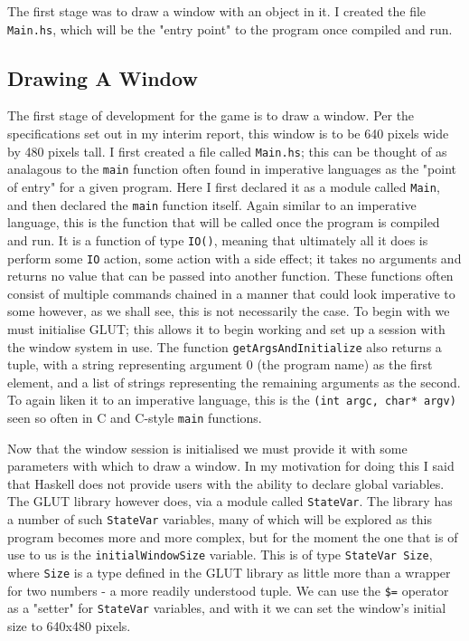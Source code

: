 \documentclass[12pt, a4paper]{report}
\begin{document}
The first stage was to draw a window with an object in it.
I created the file \verb|Main.hs|, which will be the "entry point" to the program once compiled and run.

\subsection{Drawing A Window}

The first stage of development for the game is to draw a window.
Per the specifications set out in my interim report, this window is to be 640 pixels wide by 480 pixels tall.
I first created a file called \verb|Main.hs|; this can be thought of as analagous to the \verb|main| function often found in imperative languages as the "point of entry" for a given program.
Here I first declared it as a module called \verb|Main|, and then declared the \verb|main| function itself.
Again similar to an imperative language, this is the function that will be called once the program is compiled and run.
It is a function of type \verb|IO()|, meaning that ultimately all it does is perform some \verb|IO| action, some action with a side effect; it takes no arguments and returns no value that can be passed into another function.
These functions often consist of multiple commands chained in a manner that could look imperative to some however, as we shall see, this is not necessarily the case.
To begin with we must initialise GLUT; this allows it to begin working and set up a session with the window system in use.
The function \verb|getArgsAndInitialize| also returns a tuple, with a string representing argument 0 (the program name) as the first element, and a list of strings representing the remaining arguments as the second.
To again liken it to an imperative language, this is the \verb|(int argc, char* argv)| seen so often in C and C-style \verb|main| functions.

\par

Now that the window session is initialised we must provide it with some parameters with which to draw a window.
In my motivation for doing this I said that Haskell does not provide users with the ability to declare global variables.
The GLUT library however does, via a module called \verb|StateVar|.
The library has a number of such \verb|StateVar| variables, many of which will be explored as this program becomes more and more complex, but for the moment the one that is of use to us is the \verb|initialWindowSize| variable.
This is of type \verb|StateVar Size|, where \verb|Size| is a type defined in the GLUT library as little more than a wrapper for two numbers - a more readily understood tuple.
We can use the \verb|$=| operator as a "setter" for \verb|StateVar| variables, and with it we can set the window's initial size to 640x480 pixels.
\end{document}
